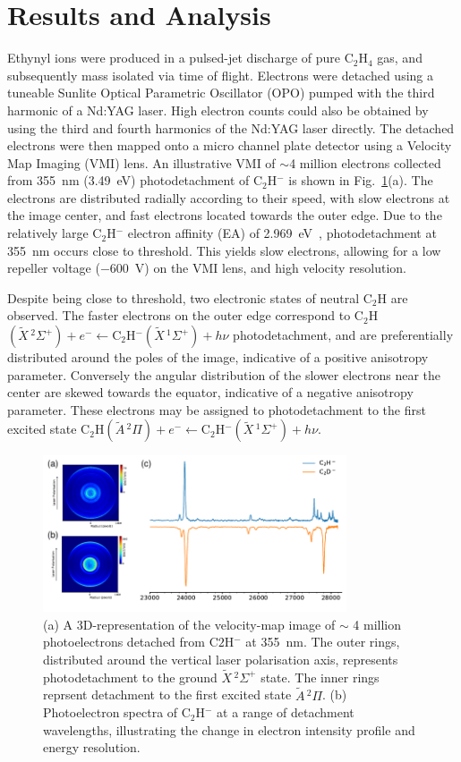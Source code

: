 \documentclass[journal=jpcafh,manuscript=article,layout=onecolumn, 12pt]{achemso}
\begin{document}
\section{Results and Analysis}
Ethynyl ions were produced in a pulsed-jet discharge of pure C$_2$H$_4$ gas, and subsequently mass isolated via time of flight. Electrons were detached using a tuneable Sunlite Optical Parametric Oscillator (OPO) pumped with the third harmonic of a Nd:YAG laser. High electron counts could also be obtained by using the third and fourth harmonics of the Nd:YAG laser directly. The detached electrons were then mapped onto a micro channel plate detector using a Velocity Map Imaging (VMI) lens. An illustrative VMI of $\sim$4 million electrons collected from 355~nm (3.49~eV) photodetachment of C$_2$H$^-$ is shown in Fig.~\ref{fig:1}(a). The electrons are distributed radially according to their speed, with slow electrons at the image center, and fast electrons located towards the outer edge. Due to the relatively large C$_2$H$^-$ electron affinity (EA) of 2.969~eV~\cite{erv91}, photodetachment at 355~nm occurs close to threshold. This yields slow electrons, allowing for a low repeller voltage ($-600$~V) on the VMI lens, and high velocity resolution. 


Despite being close to threshold, two electronic states of neutral C$_2$H are observed. The faster electrons on the outer edge correspond to C$_2$H$(\tilde{X}\,^2\Sigma^+)+e^- \leftarrow $C$_2$H$^-(\tilde{X}\,^1\Sigma^+)+h\nu$ photodetachment, and are preferentially distributed around the poles of the image, indicative of a positive anisotropy parameter. Conversely the angular distribution of the slower electrons near the center are skewed towards the equator, indicative of a negative anisotropy parameter. These electrons may be assigned to photodetachment to the first excited state C$_2$H$(\tilde{A}\,^2\Pi)+e^- \leftarrow $C$_2$H$^-(\tilde{X}\,^1\Sigma^+)+h\nu$.

\begin{figure}
	\includegraphics[width=0.8\textwidth]{figures/Fig1}
	\caption{(a) A 3D-representation of the velocity-map image of $\sim$ 4 million photoelectrons detached from C$2$H$^-$ at 355~nm. The outer rings, distributed around the vertical laser polarisation axis, represents photodetachment to the ground $\tilde{X}\,^2\Sigma^+$ state. The inner rings reprsent detachment to the first excited state $\tilde{A}\,^2\Pi$. (b) Photoelectron spectra of C$_2$H$^-$ at a range of detachment wavelengths, illustrating the change in electron intensity profile and energy resolution.}
	\label{fig:1}
\end{figure}
\end{document}
